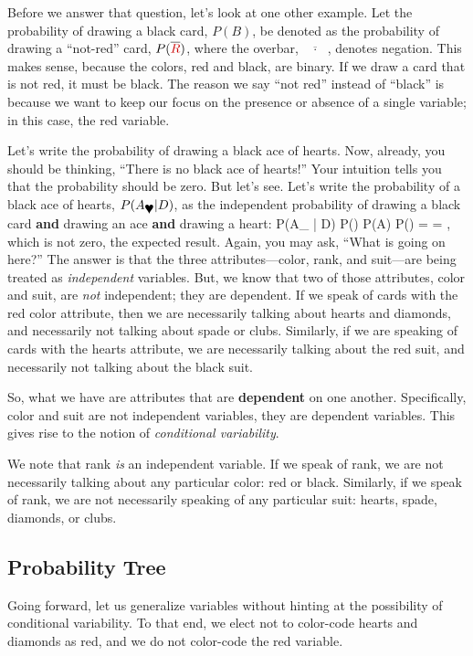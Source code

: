 Before we answer that question, let's look at one other example.
Let the probability of drawing a black card, $P(B)$, be 
denoted as the probability 
of drawing a ``not-red'' card, $P(\overline{\color{red}R})$, 
where the overbar, $\overline{\mbox{ $\cdot$ }}$, denotes negation.  
This makes sense, because the colors, red and black, 
are binary.  If we draw a card that is not red, it must be black.  
The reason we say ``not red'' instead of ``black'' is because we 
want to keep our focus on the presence or absence of a single variable; 
in this case, the red variable.  

Let's write the probability of drawing a black ace of hearts.  
Now, already, you should be thinking, ``There is no black ace of hearts!''  
Your intuition tells you that the probability should be zero.  But let's see.  
Let's write the probability of a black ace of hearts,
$P({A_{\mbox{\ding{170}}}} | D)$, 
as the independent probability of drawing a black card {\bf and} drawing an ace {\bf and} drawing a heart:
\be
P({A_{\mbox{}}} | D) 
P() \;\cap\; P(A) \;\cap\; P({\color{red}\mbox{}}) =  \cdot{} \cdot{} = , 
\label{eq:double_count_two}
\ee
which is not zero, the expected result.  Again, you may ask, ``What is going on here?''
The answer is that the three attributes---color, rank, and suit---are being treated as {\em independent} variables.  But, we know that two of those attributes, color and suit, are {\em not} independent; they are dependent.  If we speak of cards with the red color attribute, then we are necessarily talking about hearts and diamonds, and necessarily not talking about spade or clubs.  Similarly, if we are speaking of cards with the hearts attribute, we are necessarily talking about the red suit, and necessarily not talking about the black suit.   

So, what we have are attributes that are {\bf dependent} on one another.  Specifically, color and suit are not independent variables, they are dependent variables.  This gives rise to the notion of {\em conditional variability}.   

We note that rank {\em is} an independent variable.  If we speak of rank, we are not necessarily talking about any particular color: red or black.  Similarly, if we speak of rank, we are not necessarily speaking of any particular suit: hearts, spade, diamonds, or clubs.

\subsection{Probability Tree}  Going forward, let us generalize variables without hinting at the possibility of conditional variability.  To that end, we elect not to color-code hearts and diamonds as red, and we do not color-code the red variable.  


